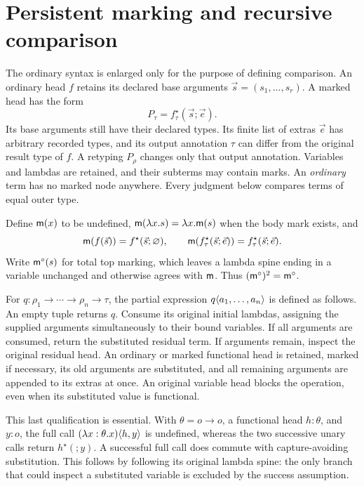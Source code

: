 \section{Persistent marking and recursive comparison}\label{sec:comparison}

The ordinary syntax is enlarged only for the purpose of defining comparison.
An ordinary head $f$ retains its declared base arguments
$\vec s=(s_1,\ldots,s_r)$. A marked head has the form
\[
 P_\tau=f^\star_\tau(\vec s;\vec e).
\]
Its base arguments still have their declared types. Its finite list of
extras $\vec e$ has arbitrary recorded types, and its output annotation
$\tau$ can differ from the original result type of $f$. A retyping $P_\rho$
changes only that output annotation. Variables and lambdas are retained,
and their subterms may contain marks. An \emph{ordinary} term has no marked
node anywhere. Every judgment below compares terms of equal outer type.

\begin{definition}
Define $\mathsf m(x)$ to be undefined,
$\mathsf m(\lambda x.s)=\lambda x.\mathsf m(s)$ when the body mark exists, and
\[
 \mathsf m(f(\vec s))=f^\star(\vec s;\varnothing),\qquad
 \mathsf m(f^\star_\tau(\vec s;\vec e))=f^\star_\tau(\vec s;\vec e).
\]
Write $\mathsf m^\circ(s)$ for total top marking, which leaves a lambda spine
ending in a variable unchanged and otherwise agrees with $\mathsf m$.
Thus $(\mathsf m^\circ)^2=\mathsf m^\circ$.
\end{definition}

\begin{definition}\label{def:application}
For $q:\rho_1\to\cdots\to\rho_n\to\tau$, the partial expression
$q\langle a_1,\ldots,a_n\rangle$ is defined as follows. An empty tuple returns $q$.
Consume its original initial lambdas, assigning the supplied arguments
simultaneously to their bound variables. If all arguments are consumed,
return the substituted residual term. If arguments remain, inspect the
original residual head. An ordinary or marked functional head is retained,
marked if necessary, its old arguments are substituted, and all remaining
arguments are appended to its extras at once. An original variable head
blocks the operation, even when its substituted value is functional.
\end{definition}

This last qualification is essential. With $\theta=o\to o$, a functional
head $h:\theta$, and $y:o$, the full call
$(\lambda x:\theta.x)\langle h,y\rangle$ is undefined, whereas the two successive
unary calls return $h^\star(;y)$. A successful full call does commute
with capture-avoiding substitution. This follows by following its original
lambda spine: the only branch that could inspect a substituted variable
is excluded by the success assumption.

